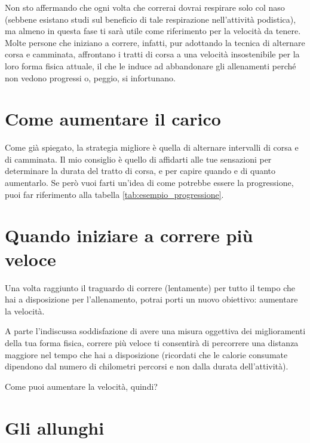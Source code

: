 Non sto affermando che ogni volta che correrai dovrai
respirare solo col naso (sebbene esistano studi sul beneficio di tale
respirazione nell'attività podistica), ma almeno in questa fase
ti sarà utile come riferimento per la velocità da tenere.
Molte persone che iniziano a correre, infatti, pur adottando la tecnica di alternare corsa e camminata, affrontano i tratti di corsa a una velocità insostenibile per la loro forma fisica attuale, il che le induce ad abbandonare gli allenamenti perché non vedono progressi o, peggio, si infortunano.

\section{Come aumentare il carico}

Come già spiegato, la strategia migliore è quella di alternare intervalli
di corsa e di camminata.
Il mio consiglio è quello di affidarti alle tue
sensazioni per determinare la durata del tratto di corsa, e per capire
quando e di quanto aumentarlo.
Se però vuoi farti un'idea di come
potrebbe essere la progressione, puoi far riferimento alla tabella
\ref{tab:esempio_progressione}.

\begin{table}[ht]
\centering
\renderprogressiontable
\caption{Esempio di progressione per iniziare a correre.}
\label{tab:esempio_progressione}
\end{table}

\section{Quando iniziare a correre più veloce}

Una volta raggiunto il traguardo di correre (lentamente)
per tutto il tempo che hai a disposizione per l'allenamento,
potrai porti un nuovo obiettivo: aumentare la velocità.

A parte l'indiscussa soddisfazione di avere una misura oggettiva
dei miglioramenti della tua forma fisica,
correre più veloce ti consentirà di percorrere una distanza
maggiore nel tempo che hai a disposizione
(ricordati che le calorie consumate dipendono dal
numero di chilometri percorsi e non dalla durata dell'attività).

Come puoi aumentare la velocità, quindi?

\section{Gli allunghi}

